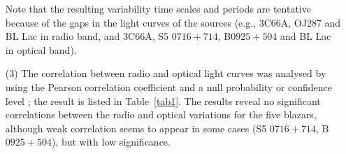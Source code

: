 \documentclass[a4paper,fleqn,usenatbib]{mnras}
\begin{document}
\begin{itemize}
Note that the resulting variability time scales and periods are tentative because of the gaps in the light curves of the sources (e.g., 3C66A, OJ287 and BL Lac in radio band, and 3C66A, S5 \(0716+714\), B\(0925+504\) and BL Lac in optical band).

\item[(3)] The correlation between radio and optical light curves was analysed by using the Pearson correlation coefficient and a null probability or confidence level \citep[e.g.][]{olk58,fan17}; the result is listed in Table~\ref{tab1}. The results reveal no significant correlations between the radio and optical variations for the five blazars, although weak correlation seems to appear in some cases (S5 \(0716+714\), B\(0925+504\)), but with low significance.
\end{itemize}
\end{document}
